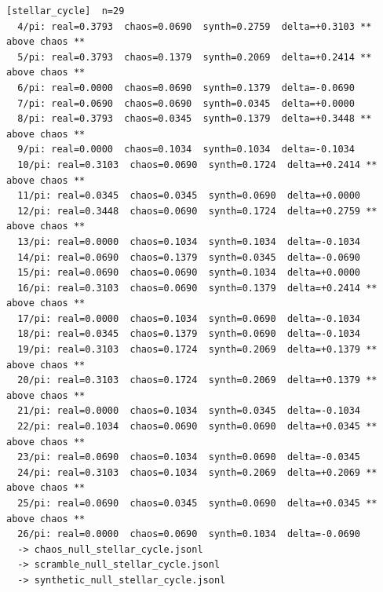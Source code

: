 \documentclass[11pt, letterpaper, openany]{book}
\begin{document}
\begin{empiricalbox}
\begin{lstlisting}[style=terminal]
[stellar_cycle]  n=29
  4/pi: real=0.3793  chaos=0.0690  synth=0.2759  delta=+0.3103 ** above chaos **
  5/pi: real=0.3793  chaos=0.1379  synth=0.2069  delta=+0.2414 ** above chaos **
  6/pi: real=0.0000  chaos=0.0690  synth=0.1379  delta=-0.0690
  7/pi: real=0.0690  chaos=0.0690  synth=0.0345  delta=+0.0000
  8/pi: real=0.3793  chaos=0.0345  synth=0.1379  delta=+0.3448 ** above chaos **
  9/pi: real=0.0000  chaos=0.1034  synth=0.1034  delta=-0.1034
  10/pi: real=0.3103  chaos=0.0690  synth=0.1724  delta=+0.2414 ** above chaos **
  11/pi: real=0.0345  chaos=0.0345  synth=0.0690  delta=+0.0000
  12/pi: real=0.3448  chaos=0.0690  synth=0.1724  delta=+0.2759 ** above chaos **
  13/pi: real=0.0000  chaos=0.1034  synth=0.1034  delta=-0.1034
  14/pi: real=0.0690  chaos=0.1379  synth=0.0345  delta=-0.0690
  15/pi: real=0.0690  chaos=0.0690  synth=0.1034  delta=+0.0000
  16/pi: real=0.3103  chaos=0.0690  synth=0.1379  delta=+0.2414 ** above chaos **
  17/pi: real=0.0000  chaos=0.1034  synth=0.0690  delta=-0.1034
  18/pi: real=0.0345  chaos=0.1379  synth=0.0690  delta=-0.1034
  19/pi: real=0.3103  chaos=0.1724  synth=0.2069  delta=+0.1379 ** above chaos **
  20/pi: real=0.3103  chaos=0.1724  synth=0.2069  delta=+0.1379 ** above chaos **
  21/pi: real=0.0000  chaos=0.1034  synth=0.0345  delta=-0.1034
  22/pi: real=0.1034  chaos=0.0690  synth=0.0690  delta=+0.0345 ** above chaos **
  23/pi: real=0.0690  chaos=0.1034  synth=0.0690  delta=-0.0345
  24/pi: real=0.3103  chaos=0.1034  synth=0.2069  delta=+0.2069 ** above chaos **
  25/pi: real=0.0690  chaos=0.0345  synth=0.0690  delta=+0.0345 ** above chaos **
  26/pi: real=0.0000  chaos=0.0690  synth=0.1034  delta=-0.0690
  -> chaos_null_stellar_cycle.jsonl
  -> scramble_null_stellar_cycle.jsonl
  -> synthetic_null_stellar_cycle.jsonl


\end{lstlisting}
\end{empiricalbox}
\end{document}
